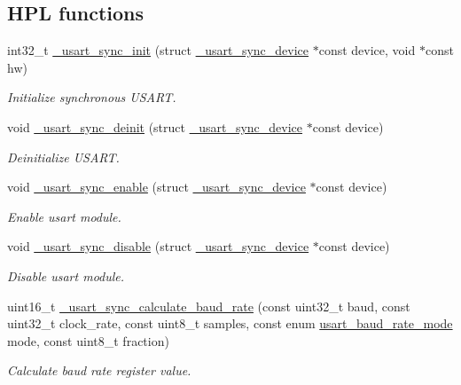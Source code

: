 \subsection*{H\+PL functions}
\begin{DoxyCompactItemize}
\item 
int32\+\_\+t \hyperlink{group___h_p_l_gad1cc7b8e72fd67fdeec8062c802eb25a}{\+\_\+usart\+\_\+sync\+\_\+init} (struct \hyperlink{struct__usart__sync__device}{\+\_\+usart\+\_\+sync\+\_\+device} $\ast$const device, void $\ast$const hw)
\begin{DoxyCompactList}\small\item\em Initialize synchronous U\+S\+A\+RT. \end{DoxyCompactList}\item 
void \hyperlink{group___h_p_l_gac046761a56aaedeba5acad135cab707c}{\+\_\+usart\+\_\+sync\+\_\+deinit} (struct \hyperlink{struct__usart__sync__device}{\+\_\+usart\+\_\+sync\+\_\+device} $\ast$const device)
\begin{DoxyCompactList}\small\item\em Deinitialize U\+S\+A\+RT. \end{DoxyCompactList}\item 
void \hyperlink{group___h_p_l_ga5ca07057bde212b46f6547e5bdb876de}{\+\_\+usart\+\_\+sync\+\_\+enable} (struct \hyperlink{struct__usart__sync__device}{\+\_\+usart\+\_\+sync\+\_\+device} $\ast$const device)
\begin{DoxyCompactList}\small\item\em Enable usart module. \end{DoxyCompactList}\item 
void \hyperlink{group___h_p_l_gac021f29c77d8a9bfabfdd7433dbbb024}{\+\_\+usart\+\_\+sync\+\_\+disable} (struct \hyperlink{struct__usart__sync__device}{\+\_\+usart\+\_\+sync\+\_\+device} $\ast$const device)
\begin{DoxyCompactList}\small\item\em Disable usart module. \end{DoxyCompactList}\item 
uint16\+\_\+t \hyperlink{group___h_p_l_ga0f2e4f3338270295eea1d4e1b00bfa1e}{\+\_\+usart\+\_\+sync\+\_\+calculate\+\_\+baud\+\_\+rate} (const uint32\+\_\+t baud, const uint32\+\_\+t clock\+\_\+rate, const uint8\+\_\+t samples, const enum \hyperlink{group___h_p_l_ga59141b5eb86f4d53f17bbeab1d7c83e7}{usart\+\_\+baud\+\_\+rate\+\_\+mode} mode, const uint8\+\_\+t fraction)
\begin{DoxyCompactList}\small\item\em Calculate baud rate register value. \end{DoxyCompactList}\item 

\end{DoxyCompactItemize}
